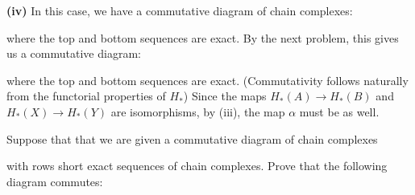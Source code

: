 \documentclass[11pt,letterpaper]{article}
\begin{document}
\begin{solution}
    \textbf{(iv)} In this case, we have a commutative diagram of chain complexes:
    \begin{center}
    \end{center}
    where the top and bottom sequences are exact. By the next problem, this gives us a commutative diagram:
    \begin{center}
    \end{center}
    where the top and bottom sequences are exact. (Commutativity follows naturally from the functorial properties of $H_*$) Since the maps $H_*(A)\to H_*(B)$ and $H_*(X)\to H_*(Y)$ are isomorphisms, by (iii), the map $\alpha$ must be as well. 
\end{solution}

\begin{problem}
    Suppose that that we are given a commutative diagram of chain complexes
    \medskip
    \begin{center}
    \end{center}
    \medskip
    with rows short exact sequences of chain complexes. Prove that the following diagram commutes:
    \medskip
    \begin{center}
    \end{center}
\end{problem}
\end{document}
